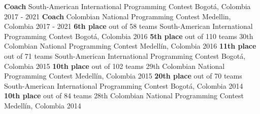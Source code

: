 
\begin{cvhonors}
  \cvhonor
    {\textbf{Coach}}
    {South-American International Programming Contest}
    {Bogotá, Colombia}
    {2017 - 2021}
  \cvhonor
    {\textbf{Coach}}
    {Colombian National Programming Contest}
    {Medellin, Colombia}
    {2017 - 2021}
  \cvhonor
    {\textbf{6th place} out of 58 teams}
    {South-American International Programming Contest}
    {Bogotá, Colombia}
    {2016}
  \cvhonor
    {\textbf{5th place} out of 110 teams}
    {30th Colombian National Programming Contest}
    {Medellín, Colombia}
    {2016}
  \cvhonor
    {\textbf{11th place} out of 71 teams}
    {South-American International Programming Contest}
    {Bogotá, Colombia}
    {2015}
  \cvhonor
    {\textbf{10th place} out of 102 teams}
    {29th Colombian National Programming Contest}
    {Medellín, Colombia}
    {2015}
  \cvhonor
    {\textbf{20th place} out of 70 teams}
    {South-American International Programming Contest}
    {Bogotá, Colombia}
    {2014}
  \cvhonor
    {\textbf{10th place} out of 84 teams}
    {28th Colombian National Programming Contest}
    {Medellín, Colombia}
    {2014}
\end{cvhonors}
